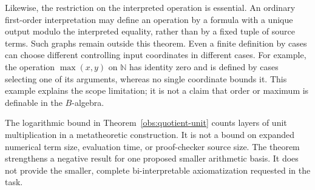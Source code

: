 Likewise, the restriction on the interpreted operation is essential.
An ordinary first-order interpretation may define an operation by a
formula with a unique output modulo the interpreted equality, rather
than by a fixed tuple of source terms. Such graphs remain outside this
theorem. Even a finite definition by cases can choose different
controlling input coordinates in different cases. For example, the
operation $\max(x,y)$ on $\mathbb N$ has identity zero and is defined by
cases selecting one of its arguments, whereas no single coordinate
bounds it. This example explains the scope limitation; it is not a
claim that order or maximum is definable in the $B$-algebra.

The logarithmic bound in Theorem~\ref{obs:quotient-unit} counts layers of
unit multiplication in a metatheoretic construction. It is not a bound
on expanded numerical term size, evaluation time, or proof-checker
source size. The theorem strengthens a negative result for one proposed
smaller arithmetic basis. It does not provide the smaller, complete
bi-interpretable axiomatization requested in the task.
